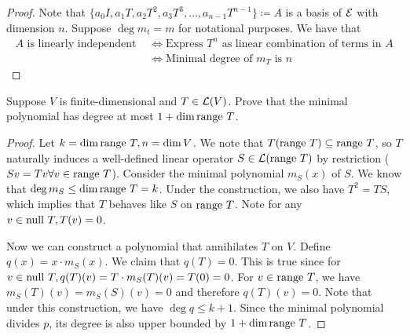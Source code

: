 \documentclass{extarticle}
\begin{document}
\begin{proof}
Note that \(\{a_0 I, a_1 T, a_2 T^2, a_3 T^3, \ldots, a_{n-1} T^{n-1}\} \coloneqq A\) is a basis of \(\mathcal{E}\) with dimension \(n\). 
Suppose \(\deg m_t = m\) for notational purposes. We have that 
\begin{align*}
    A \text{ is linearly independent } &\Longleftrightarrow \text{Express } T^n \text{ as linear combination of terms in } A \\ 
    &\Longleftrightarrow \text{Minimal degree of } m_T \text{ is } n 
\end{align*}

\end{proof}

\begin{problem}{21}
    Suppose \(V\) is finite-dimensional and \(T \in \mathcal{L}(V)\). Prove that the minimal polynomial has 
    degree at most \(1 + \dim \text{range } T\).
\end{problem}

\begin{proof}
Let \(k = \dim \text{range } T, n = \dim V\). We note that \(T(\text{range } T) \subseteq \text{range } T\), so \(T\)
naturally induces a well-defined linear operator \(S \in \mathcal{L}(\text{range } T)\) by restriction (\(Sv=Tv \forall  v 
\in \text{range } T\)). Consider the minimal polynomial \(m_S(x)\) of \(S\). We know that \(\deg m_S \leq \dim 
\text{range } T = k\). Under the construction, we also have \(T^2 = TS\), which implies that \(T\) behaves like 
\(S\) on \(\text{range } T\). Note for any \(v \in \text{null } T, T(v) = 0\). 

Now we can construct a polynomial that annihilates \(T\) on \(V\). Define \(q(x) = x \cdot m_S(x)\). We 
claim that \(q(T) = 0\). This is true since for \(v \in \text{null } T, q(T)(v) = T \cdot m_S(T)(v) = T(0) = 0\). 
For \(v \in \text{range } T\), we have \(m_S(T)(v) = m_S(S)(v) = 0\) and therefore \(q(T)(v) = 0\). Note that 
under this construction, we have \(\deg q \leq k + 1\). Since the minimal polynomial divides \(p\), its 
degree is also upper bounded by \(1 + \dim \text{range } T\). 


\end{proof}
\end{document}
